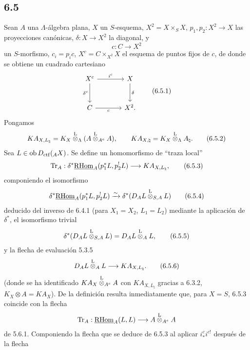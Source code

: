 \subsection*{6.5}
Sean $A$ una $\Lambda$-álgebra plana, $X$ un $S$-esquema, $X^2=X\times_SX$, $p_1,p_2:X^2\to X$ las proyecciones canónicas, $\delta:X\to X^2$ la diagonal, y
\[
c:C\longrightarrow X^2
\]
un $S$-morfismo, $c_i=p_ic$, $X^c=C\times_{X^2}X$ el esquema de puntos fijos de $c$, de donde se obtiene un cuadrado cartesiano
\begin{equation}
\begin{tikzcd}[column sep=large,row sep=large]
X^c \arrow[r,"i^c"] \arrow[d,"\delta^c"'] & X \arrow[d,"\delta"]\\
C \arrow[r,"c"'] & X^2 .
\end{tikzcd}
\tag{6.5.1}
\end{equation}
Pongamos
\begin{equation}
KA_{X,L_{\natural}}=K_X\overset{\mathrm L}{\otimes}_{\Lambda}(A\overset{\mathrm L}{\otimes}_{A^e}A),
\qquad
KA_{X,\natural}=K_X\overset{\mathrm L}{\otimes}_{\Lambda}A_{\natural}.
\tag{6.5.2}
\end{equation}
Sea $L\in\operatorname{ob} D_{\mathrm{ctf}}({}_AX)$. Se define un homomorfismo de ``traza local''
\begin{equation}
\operatorname{Tr}_A:\delta^*\underline{\mathrm{RHom}}_A(p_1^*L,p_2^!L)
\longrightarrow
KA_{X,L_{\natural}},
\tag{6.5.3}
\end{equation}
componiendo el isomorfismo
\begin{equation}
\delta^*\underline{\mathrm{RHom}}_A(p_1^*L,p_2^!L)
\xrightarrow{\sim}
\delta^*(D_AL\overset{\mathrm L}{\otimes}_{S,A}L)
\tag{6.5.4}
\end{equation}
deducido del inverso de 6.4.1 (para $X_1=X_2$, $L_1=L_2$) mediante la aplicación de $\delta^*$, el isomorfismo trivial
\begin{equation}
\delta^*(D_AL\overset{\mathrm L}{\otimes}_{S,A}L)=D_AL\overset{\mathrm L}{\otimes}_AL,
\tag{6.5.5}
\end{equation}
y la flecha de evaluación 5.3.5
\begin{equation}
D_AL\overset{\mathrm L}{\otimes}_AL\longrightarrow KA_{X,L_{\natural}}.
\tag{6.5.6}
\end{equation}
(donde se ha identificado $KA_X\overset{\mathrm L}{\otimes}_{A^e}A$ con $KA_{X,L_{\natural}}$ gracias a 6.3.2, $K_X\otimes A=KA_X$). De la definición resulta inmediatamente que, para $X=S$, 6.5.3 coincide con la flecha
\[
\operatorname{Tr}_A:\underline{\mathrm{RHom}}_A(L,L)\longrightarrow A\overset{\mathrm L}{\otimes}_{A^e}A
\]
de 5.6.1. Componiendo la flecha que se deduce de 6.5.3 al aplicar $i_*^ci^{c!}$ después de la flecha
